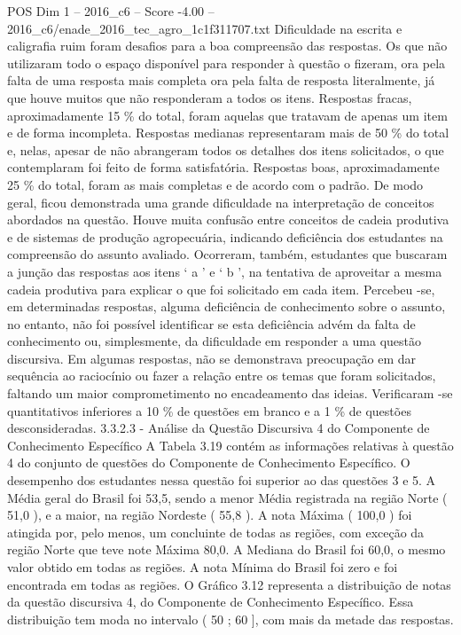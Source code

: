 \begin{textsample}{POS Dim 1 – 2016\_c6 – Score -4.00 – 2016\_c6/enade\_2016\_tec\_agro\_1c1f311707.txt}
Dificuldade na escrita e caligrafia ruim foram desafios para a boa compreensão das respostas.
Os que não utilizaram todo o espaço disponível para responder à questão o fizeram, ora pela falta de uma resposta mais completa ora pela falta de resposta literalmente, já que houve muitos que não responderam a todos os itens.
Respostas fracas, aproximadamente 15 \% do total, foram aquelas que tratavam de apenas um item e de forma incompleta.
Respostas medianas representaram mais de 50 \% do total e, nelas, apesar de não abrangeram todos os detalhes dos itens solicitados, o que contemplaram foi feito de forma satisfatória.
Respostas boas, aproximadamente 25 \% do total, foram as mais completas e de acordo com o padrão.
De modo geral, ficou demonstrada uma grande dificuldade na interpretação de conceitos abordados na questão.
Houve muita confusão entre conceitos de cadeia produtiva e de sistemas de produção agropecuária, indicando deficiência dos estudantes na compreensão do assunto avaliado.
Ocorreram, também, estudantes que buscaram a junção das respostas aos itens ‘ a ’ e ‘ b ’, na tentativa de aproveitar a mesma cadeia produtiva para explicar o que foi solicitado em cada item.
Percebeu -se, em determinadas respostas, alguma deficiência de conhecimento sobre o assunto, no entanto, não foi possível identificar se esta deficiência advém da falta de conhecimento ou, simplesmente, da dificuldade em responder a uma questão discursiva.
Em algumas respostas, não se demonstrava preocupação em dar sequência ao raciocínio ou fazer a relação entre os temas que foram solicitados, faltando um maior comprometimento no encadeamento das ideias.
Verificaram -se quantitativos inferiores a 10 \% de questões em branco e a 1 \% de questões desconsideradas. 3.3.2.3 - Análise da Questão Discursiva 4 do Componente de Conhecimento Específico A Tabela 3.19 contém as informações relativas à questão 4 do conjunto de questões do Componente de Conhecimento Específico.
O desempenho dos estudantes nessa questão foi superior ao das questões 3 e 5.
A Média geral do Brasil foi 53,5, sendo a menor Média registrada na região Norte ( 51,0 ), e a maior, na região Nordeste ( 55,8 ).
A nota Máxima ( 100,0 ) foi atingida por, pelo menos, um concluinte de todas as regiões, com exceção da região Norte que teve note Máxima 80,0.
A Mediana do Brasil foi 60,0, o mesmo valor obtido em todas as regiões.
A nota Mínima do Brasil foi zero e foi encontrada em todas as regiões.
O Gráfico 3.12 representa a distribuição de notas da questão discursiva 4, do Componente de Conhecimento Específico.
Essa distribuição tem moda no intervalo ( 50 ; 60 ], com mais da metade das respostas.

\end{textsample}
